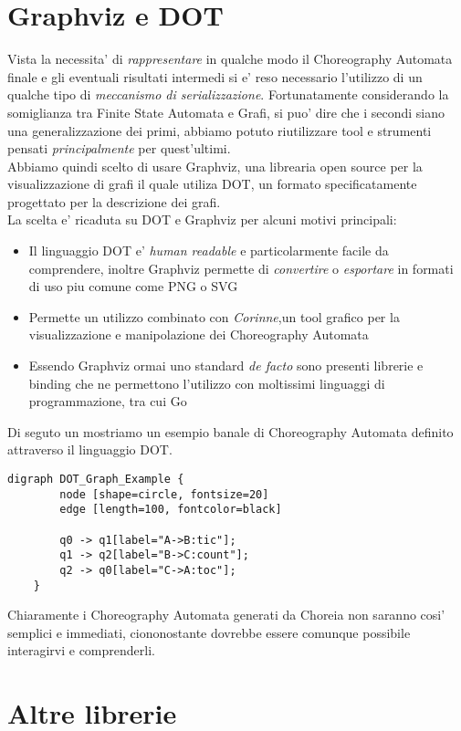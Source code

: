 \section{Graphviz e DOT}
Vista la necessita' di \emph{rappresentare} in qualche modo il Choreography Automata finale e gli eventuali risultati intermedi si e' reso necessario l'utilizzo di un qualche tipo di \emph{meccanismo di serializzazione}. Fortunatamente considerando la somiglianza tra Finite State Automata e Grafi, si puo' dire che i secondi siano una generalizzazione dei primi, abbiamo potuto riutilizzare tool e strumenti pensati \emph{principalmente} per quest'ultimi.\\
Abbiamo quindi scelto di usare Graphviz, una librearia open source per la visualizzazione di grafi il quale utiliza DOT, un formato specificatamente progettato per la descrizione dei grafi.\\
La scelta e' ricaduta su DOT e Graphviz per alcuni motivi principali:
\begin{itemize}
    \item Il linguaggio DOT e' \emph{human readable} e particolarmente facile da comprendere, inoltre Graphviz permette di \emph{convertire} o \emph{esportare} in formati di uso piu comune come PNG o SVG
    \item Permette un utilizzo combinato con \emph{Corinne},un tool grafico per la visualizzazione e manipolazione dei Choreography Automata
    \item Essendo Graphviz ormai uno standard \emph{de facto} sono presenti librerie e binding che ne permettono l'utilizzo con moltissimi linguaggi di programmazione, tra cui Go
\end{itemize}
Di seguto un mostriamo un esempio banale di Choreography Automata definito attraverso il linguaggio DOT.
\begin{lstlisting}[caption=Rappresentazione in DOT dell'automa in figura \ref{fig:ChoreographyAutomata_Example}]
    digraph DOT_Graph_Example {
        node [shape=circle, fontsize=20]
        edge [length=100, fontcolor=black]
      
        q0 -> q1[label="A->B:tic"];
        q1 -> q2[label="B->C:count"];
        q2 -> q0[label="C->A:toc"];
    }
\end{lstlisting}
Chiaramente i Choreography Automata generati da Choreia non saranno cosi' semplici e immediati, ciononostante dovrebbe essere comunque possibile interagirvi e comprenderli.

\section{Altre librerie} %